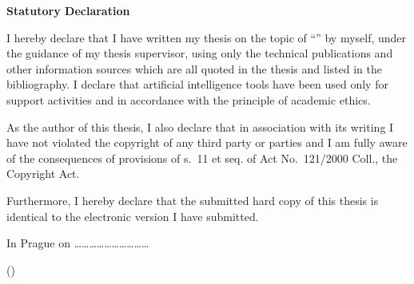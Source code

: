 \textbf{Statutory Declaration}

I hereby declare that I have written my \MakeLowercase{\thesistype} thesis on the topic of
\enquote{\thesistitle} by myself, under the guidance of my thesis
supervisor, using only the technical publications and other information
sources which are all quoted in the thesis and listed in the bibliography.
I declare that artificial intelligence tools have been used only for
support activities and in accordance with the principle of academic ethics.

As the author of this \MakeLowercase{\thesistype} thesis, I also declare that in association
with its writing I have not violated the copyright of any third party or
parties and I am fully aware of the consequences of provisions of
s.~11 et seq. of Act No.~121/2000 Coll., the Copyright Act.

Furthermore, I hereby declare that the submitted hard copy of this \MakeLowercase{\thesistype}
thesis is identical to the electronic version I have submitted.

In Prague on
\ldots\ldots\ldots\ldots\ldots\ldots\ldots\ldots\ldots\ldots{}

(\thesisauthor)
